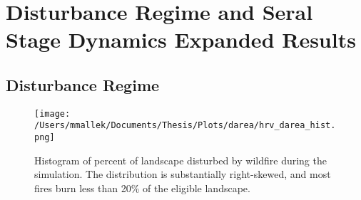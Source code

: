 \chapter{Disturbance Regime and Seral Stage Dynamics Expanded Results}
\label{app:full-results}

\section{Disturbance Regime}
\begin{figure}[!htbp]
\centering
\texttt{[image: /Users/mmallek/Documents/Thesis/Plots/darea/hrv\_darea\_hist.png]}
\caption{Histogram of percent of landscape disturbed by wildfire during the simulation. The distribution is substantially right-skewed, and most fires burn less than 20\% of the eligible landscape.}
\label{fig:darea_hist}
\end{figure}


